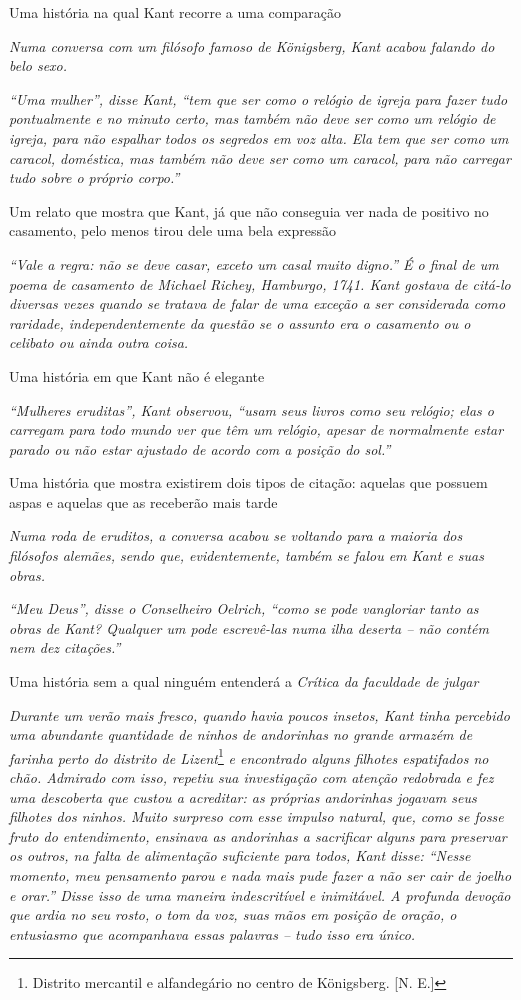 Uma história na qual Kant recorre a uma comparação

\emph{Numa conversa com um filósofo famoso de Königsberg, Kant acabou
falando do belo sexo.}

\emph{``Uma mulher'', disse Kant, ``tem que ser como o relógio de igreja
para fazer tudo pontualmente e no minuto certo, mas também não deve ser
como um relógio de igreja, para não espalhar todos os segredos em voz
alta. Ela tem que ser como um caracol, doméstica, mas também não deve
ser como um caracol, para não carregar tudo sobre o próprio corpo.''}

Um relato que mostra que Kant, já que não conseguia ver nada de positivo
no casamento, pelo menos tirou dele uma bela expressão

\emph{``Vale a regra: não se deve casar, exceto um casal muito digno.''
É o final de um poema de casamento de Michael Richey, Hamburgo, 1741.
Kant gostava de citá-lo diversas vezes quando se tratava de falar de uma
exceção a ser considerada como raridade, independentemente da questão se
o assunto era o casamento ou o celibato ou ainda outra coisa.}

Uma história em que Kant não é elegante

\emph{``Mulheres eruditas'', Kant observou, ``usam seus livros como seu
relógio; elas o carregam para todo mundo ver que têm um relógio, apesar
de normalmente estar parado ou não estar ajustado de acordo com a
posição do sol.''}

Uma história que mostra existirem dois tipos de citação: aquelas que
possuem aspas e aquelas que as receberão mais tarde

\emph{Numa roda de eruditos, a conversa acabou se voltando para a
maioria dos filósofos alemães, sendo que, evidentemente, também se falou
em Kant e suas obras.}

\emph{``Meu Deus'', disse o Conselheiro Oelrich, ``como se pode
vangloriar tanto as obras de Kant? Qualquer um pode escrevê-las numa
ilha deserta -- não contém nem dez citações.''}

Uma história sem a qual ninguém entenderá a \emph{Crítica da faculdade
de julgar}

\emph{Durante um verão mais fresco, quando havia poucos insetos, Kant
tinha percebido uma abundante quantidade de ninhos de andorinhas no
grande armazém de farinha perto do distrito de Lizent}\footnote{Distrito
  mercantil e alfandegário no centro de Königsberg. [N. E.]}
\emph{e encontrado alguns filhotes espatifados no chão. Admirado com
isso, repetiu sua investigação com atenção redobrada e fez uma
descoberta que custou a acreditar: as próprias andorinhas jogavam seus
filhotes dos ninhos. Muito surpreso com esse impulso natural, que, como
se fosse fruto do entendimento, ensinava as andorinhas a sacrificar
alguns para preservar os outros, na falta de alimentação suficiente para
todos, Kant disse: ``Nesse momento, meu pensamento parou e nada mais
pude fazer a não ser cair de joelho e orar.'' Disse isso de uma maneira
indescritível e inimitável. A profunda devoção que ardia no seu rosto, o
tom da voz, suas mãos em posição de oração, o entusiasmo que acompanhava
essas palavras -- tudo isso era único.}


